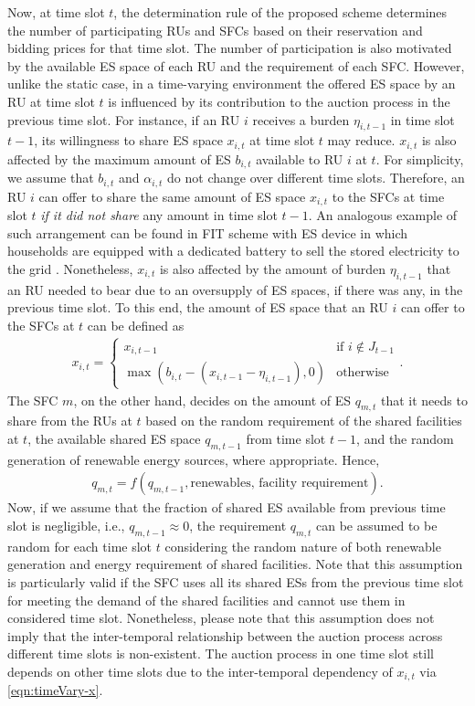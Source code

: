 \documentclass[journal,10pt]{IEEEtran}
\begin{document}
Now, at time slot $t$, the determination rule of the proposed scheme determines the number of participating RUs and SFCs based on their reservation and bidding prices for that time slot. The number of participation is also motivated by the available ES space of each RU and the requirement of each SFC. However, unlike the static case, in a time-varying environment the offered ES space by an RU at time slot $t$ is influenced by its contribution to the auction process in the previous time slot. For instance, if an RU $i$ receives a burden $\eta_{i,t-1}$ in time slot $t-1$, its willingness to share ES space $x_{i,t}$ at time slot $t$ may reduce. $x_{i,t}$ is also affected by the  maximum amount of ES $b_{i,t}$ available to RU $i$ at $t$. For simplicity, we assume that $b_{i,t}$ and $\alpha_{i,t}$ do not change over different time slots. Therefore, an RU $i$ can offer to share the same amount of ES space $x_{i,t}$ to the SFCs at time slot $t$ \emph{if it did not share} any amount in time slot $t-1$. An analogous example of such arrangement can be found in FIT scheme with ES device in which households are equipped with a dedicated battery to sell the stored electricity to the grid \cite{Goran:2011}. Nonetheless, $x_{i,t}$ is also affected by the amount of burden $\eta_{i,t-1}$ that an RU needed to bear due to an oversupply of ES spaces, if there was any, in the previous time slot. To this end, the amount of ES space that an RU $i$ can offer to the SFCs at $t$ can be defined as
\begin{eqnarray}
x_{i,t} = \begin{cases}
x_{i,t-1} & \text{if $i\notin J_{{t-1}}$}\\
\max(b_{i,t} -  (x_{i,t-1} - \eta_{i,t-1}),0) & \text{otherwise}
\end{cases}.
\label{eqn:timeVary-x}
\end{eqnarray}
The SFC $m$, on the other hand, decides on the amount of ES $q_{m,t}$ that it needs to share from the RUs at $t$ based on the random requirement of the shared facilities at $t$, the available shared ES space $q_{m,t-1}$ from time slot $t-1$,  and the random generation of renewable energy sources, where appropriate. Hence,
\begin{eqnarray}
q_{m,t} = f(q_{m,t-1}, \text{renewables, facility requirement}).
\end{eqnarray}
Now, if we assume that the fraction of shared ES available from previous time slot is negligible, i.e., $q_{m,t-1}\approx 0$, the requirement $q_{m,t}$ can be assumed to be random for each time slot $t$ considering the random nature of both renewable generation and energy requirement of shared facilities. Note that this assumption is particularly valid if the SFC uses all its shared ESs from the previous time slot for meeting the demand of the shared facilities and cannot use them in considered time slot. Nonetheless, please note that this assumption does not imply that the inter-temporal relationship between the auction process across different time slots is non-existent. The auction process in one time slot still depends on other time slots due to the inter-temporal dependency of $x_{i,t}$ via \eqref{eqn:timeVary-x}.
\end{document}
